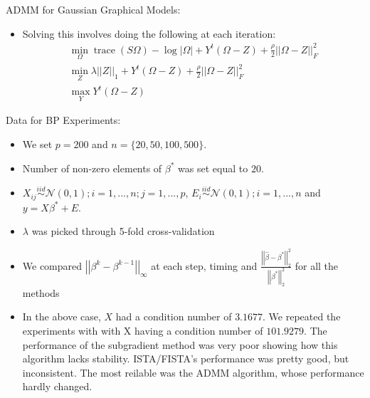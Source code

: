 \documentclass[xcolor=dvipsnames,aspectratio=1610]{beamer}
\newcommand{\norm}[1]{\left|\left|#1\right|\right|}
\newcommand{\abs}[1]{\left|#1\right|}
\DeclareMathOperator*{\trace}{trace}
\theoremstyle{remark}
\begin{document}
\begin{frame}{ADMM for Gaussian Graphical Models:}
  \begin{itemize}
    \setlength{\itemsep}{10pt}
\item Solving this involves doing the following at each iteration:
\begin{align*}
\min_{\Omega} \trace(S\Omega) - \log \abs{\Omega} + Y^t (\Omega - Z) + \frac{\rho}{2} \norm{\Omega-Z}_F^2\\
\min_{Z}  \lambda \norm{Z}_1 + Y^t (\Omega - Z) + \frac{\rho}{2} \norm{\Omega-Z}_F^2 \\
\max_{Y}  Y^t (\Omega - Z) 
\end{align*}
  \end{itemize}
\end{frame}

\begin{frame}{Data for BP Experiments:}
  \begin{itemize}
    \setlength{\itemsep}{10pt}
\item We set $p = 200$ and $n = \{20,50,100,500\}$.
\item Number of non-zero elements of $\beta^*$ was set equal to $20$. 
\item $X_{ij} \overset{iid}{\sim} \mathcal{N}(0,1); i = 1,...,n; j = 1,...,p$, $E_{i} \overset{iid}{\sim} \mathcal{N}(0,1); i = 1,...,n$ and $y = X\beta^* + E$.
\item $\lambda$ was picked through 5-fold cross-validation
\item We compared $\norm{\beta^k - \beta^{k-1}}_\infty$ at each step, timing and $\frac{\norm{\hat{\beta}-\beta^*}_2^2}{\norm{\beta^*}_2^2}$ for all the methods
\item In the above case, $X$ had a condition number of $3.1677$. We repeated the experiments with with X having a condition number of $101.9279$. The performance of the subgradient method was very poor showing how this algorithm lacks stability. ISTA/FISTA's performance was pretty good, but inconsistent. The most reilable was the ADMM algorithm, whose performance hardly changed.   
  \end{itemize}
\end{frame}
\end{document}
